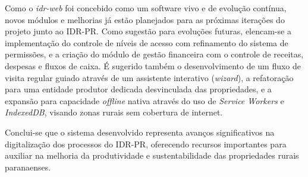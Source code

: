 Como o \textit{idr-web} foi concebido como um software vivo e de evolução contínua, novos módulos e melhorias já estão planejados para as próximas iterações do projeto junto ao \gls{IDR-PR}. Como sugestão para evoluções futuras, elencam-se a implementação do controle de níveis de acesso com refinamento do sistema de permissões, e a criação do módulo de gestão financeira com o controle de receitas, despesas e fluxos de caixa. É sugerido também o desenvolvimento de um fluxo de visita regular guiado através de um assistente interativo (\textit{wizard}), a refatoração para uma entidade produtor dedicada desvinculada das propriedades, e a expansão para capacidade \textit{offline} nativa através do uso de \textit{Service Workers} e \textit{IndexedDB}, visando zonas rurais sem cobertura de internet.

Conclui-se que o sistema desenvolvido representa avanços significativos na digitalização dos processos do \gls{IDR-PR}, oferecendo recursos importantes para auxiliar na melhoria da produtividade e sustentabilidade das propriedades rurais paranaenses.
